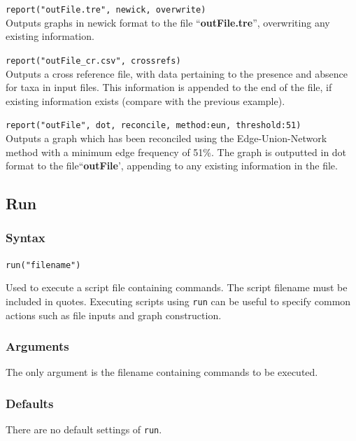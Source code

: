 		
	\begin{example}
		\item{\texttt{report("outFile.tre", newick, overwrite)}\\ Outputs graphs in newick format to 
		the file ``\textbf{outFile.tre}'', overwriting any existing information.}
		
		\item{\texttt{report("outFile\_cr.csv", crossrefs)}\\ Outputs a cross reference file, with
		data pertaining to the presence and absence for taxa in input files. This information
		is appended to the end of the file, if existing information exists (compare with the 
		previous example).}
		
		\item{\texttt{report("outFile", dot, reconcile, method:eun, threshold:51)}\\ Outputs a
		graph which has been reconciled using the Edge-Union-Network method with a 
		minimum edge frequency of 51\%. The graph is outputted in dot format to the 
		file``\textbf{outFile}', appending to any existing information in the file.}
	\end{example}

\subsection{Run}
	\subsubsection{Syntax}
		\texttt{run("filename")}
		
	\begin{phygdescription}
		{Used to execute a \phyg script file containing commands. The script filename must be 
		included in quotes. 
		Executing scripts using \texttt{run} can be useful to specify common actions such as file inputs 
		and graph construction. }
	\end{phygdescription}
	
	\subsubsection{Arguments}
		The only argument is the filename containing commands to be executed.
		
	\subsubsection{Defaults}
		There are no default settings of \texttt{run}. 
	
